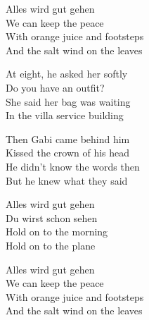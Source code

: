 \begin{lyrics}
Alles wird gut gehen\\
We can keep the peace\\
With orange juice and footsteps\\
And the salt wind on the leaves

At eight, he asked her softly\\
Do you have an outfit?\\
She said her bag was waiting\\
In the villa service building

Then Gabi came behind him\\
Kissed the crown of his head\\
He didn’t know the words then\\
But he knew what they said

Alles wird gut gehen\\
Du wirst schon sehen\\
Hold on to the morning\\
Hold on to the plane

Alles wird gut gehen\\
We can keep the peace\\
With orange juice and footsteps\\
And the salt wind on the leaves
\end{lyrics}

